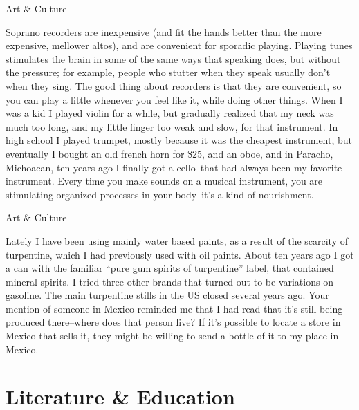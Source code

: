 \documentclass[11pt,oneside,openany,extrafontsizes]{memoir}
\begin{document}
\begin{standalonequote}{Art \& Culture}

    \begin{answer}
      Soprano recorders are inexpensive (and fit the hands better than the more expensive, mellower altos), and are convenient for sporadic playing. Playing tunes stimulates the brain in some of the same ways that speaking does, but without the pressure; for example, people who stutter when they speak usually don't when they sing. The good thing about recorders is that they are convenient, so you can play a little whenever you feel like it, while doing other things. When I was a kid I played violin for a while, but gradually realized that my neck was much too long, and my little finger too weak and slow, for that instrument. In high school I played trumpet, mostly because it was the cheapest instrument, but eventually I bought an old french horn for \$25, and an oboe, and in Paracho, Michoacan, ten years ago I finally got a cello--that had always been my favorite instrument. Every time you make sounds on a musical instrument, you are stimulating organized processes in your body--it's a kind of nourishment.
    \end{answer}
\end{standalonequote}

\begin{standalonequote}{Art \& Culture}

    \begin{answer}
      Lately I have been using mainly water based paints, as a result of the scarcity of turpentine, which I had previously used with oil paints. About ten years ago I got a can with the familiar \enquote{pure gum spirits of turpentine} label, that contained mineral spirits. I tried three other brands that turned out to be variations on gasoline. The main turpentine stills in the US closed several years ago. Your mention of someone in Mexico reminded me that I had read that it's still being produced there--where does that person live? If it's possible to locate a store in Mexico that sells it, they might be willing to send a bottle of it to my place in Mexico.
    \end{answer}
\end{standalonequote}

\section{Literature \& Education}
\end{document}
